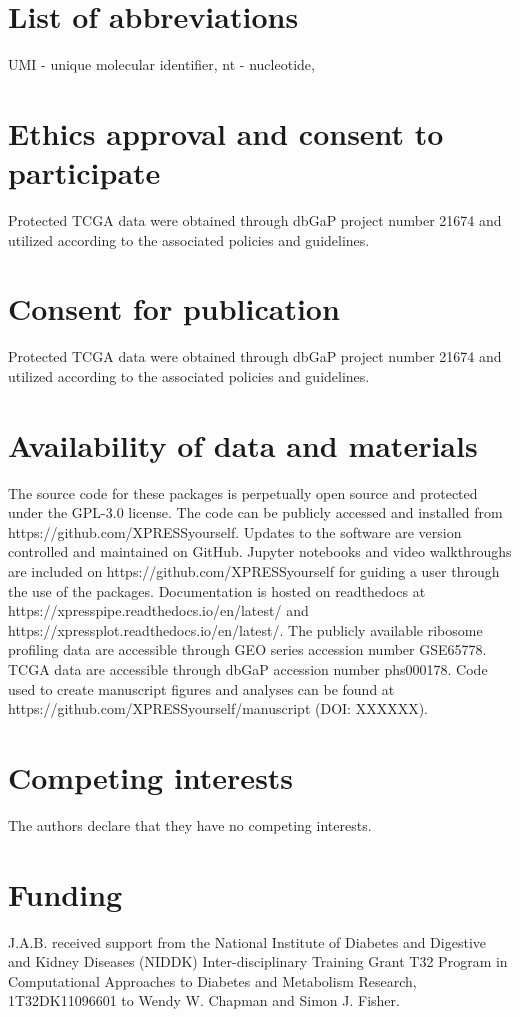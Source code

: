 \documentclass[11pt, a4paper, oneside]{article}
\begin{document}
\section*{List of abbreviations}
UMI - unique molecular identifier, nt - nucleotide,

\section*{Ethics approval and consent to participate}
Protected TCGA data were obtained through dbGaP project number 21674 and utilized according to the associated policies and guidelines.

\section*{Consent for publication}
Protected TCGA data were obtained through dbGaP project number 21674 and utilized according to the associated policies and guidelines.

\section*{Availability of data and materials}
The source code for these packages is perpetually open source and protected under the GPL-3.0 license. The code can be publicly accessed and installed from https://github.com/XPRESSyourself. Updates to the software are version controlled and maintained on GitHub. Jupyter notebooks and video walkthroughs are included on https://github.com/XPRESSyourself for guiding a user through the use of the packages. Documentation is hosted on readthedocs \cite{readthedocs} at https://xpresspipe.readthedocs.io/en/latest/ and https://xpressplot.readthedocs.io/en/latest/. The publicly available ribosome profiling data are accessible through GEO series accession number GSE65778. TCGA data are accessible through dbGaP accession number phs000178. Code used to create manuscript figures and analyses can be found at https://github.com/XPRESSyourself/manuscript (DOI: XXXXXX).

\section*{Competing interests}
The authors declare that they have no competing interests.

\section*{Funding}
J.A.B. received support from the National Institute of Diabetes and Digestive and Kidney Diseases (NIDDK) Inter-disciplinary Training Grant T32 Program in Computational Approaches to Diabetes and Metabolism Research, 1T32DK11096601 to Wendy W. Chapman and Simon J. Fisher.
\end{document}
